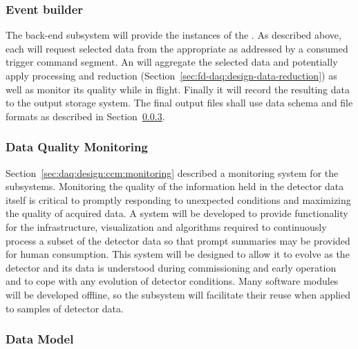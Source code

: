 \subsubsection{Event builder}
\label{sec:fd-daq:design-event-builder}

The  back-end subsystem will provide the instances of the .
As described above, each will request selected data from the appropriate  as addressed by a consumed trigger command segment. 
An  will aggregate the selected data and potentially apply processing and reduction (Section~\ref{sec:fd-daq:design-data-reduction}) as well as monitor its quality while in flight.
Finally it will record the resulting data to the output storage system.
The final output files shall use data schema and file formats as described in Section~\ref{sec:fd-daq:design-data-model}.



\subsubsection{Data Quality Monitoring}
\label{sec:fd-daq:design-data-quality}

Section~\ref{sec:daq:design:ccm:monitoring} described a monitoring system for the  subsystems. 
Monitoring the quality of the information held in the detector data itself is critical to promptly responding to unexpected conditions and maximizing the quality of acquired data. 
A   system will be developed to provide functionality for the infrastructure, visualization and algorithms required to continuously process a subset of the detector data so that prompt summaries may be provided for human consumption.
This system will be designed to allow it to evolve as the detector and its data is understood during commissioning and early operation and to cope with any evolution of detector conditions.
Many software modules will be developed offline, so the  subsystem will facilitate their reuse when applied to samples of detector data.


\subsubsection{Data Model}
\label{sec:fd-daq:design-data-model}

